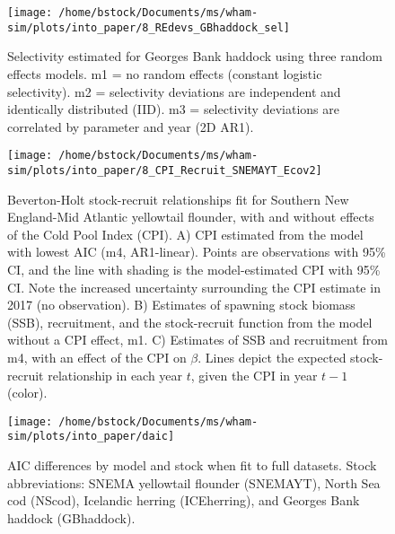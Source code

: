 \documentclass[]{article}
\begin{document}
\pagebreak

\begin{figure}

{\centering \texttt{[image: /home/bstock/Documents/ms/wham-sim/plots/into\_paper/8\_REdevs\_GBhaddock\_sel]} 

}

\caption{Selectivity estimated for Georges Bank haddock using three random effects models. m1 = no random effects (constant logistic selectivity). m2 = selectivity deviations are independent and identically distributed (IID). m3 = selectivity deviations are correlated by parameter and year (2D AR1).}\label{fig:devs-GBhaddock-sel}
\end{figure}

\pagebreak

\begin{figure}

{\centering \texttt{[image: /home/bstock/Documents/ms/wham-sim/plots/into\_paper/8\_CPI\_Recruit\_SNEMAYT\_Ecov2]} 

}

\caption{Beverton-Holt stock-recruit relationships fit for Southern New England-Mid Atlantic yellowtail flounder, with and without effects of the Cold Pool Index (CPI). A) CPI estimated from the model with lowest AIC (m4, AR1-linear). Points are observations with 95\% CI, and the line with shading is the model-estimated CPI with 95\% CI. Note the increased uncertainty surrounding the CPI estimate in 2017 (no observation). B) Estimates of spawning stock biomass (SSB), recruitment, and the stock-recruit function from the model without a CPI effect, m1. C) Estimates of SSB and recruitment from m4, with an effect of the CPI on $\beta$. Lines depict the expected stock-recruit relationship in each year $t$, given the CPI in year $t-1$ (color).}\label{fig:devs-SNEMAYT-ecov}
\end{figure}

\pagebreak

\begin{landscape}
\begin{figure}

{\centering \texttt{[image: /home/bstock/Documents/ms/wham-sim/plots/into\_paper/daic]} 

}

\caption{AIC differences by model and stock when fit to full datasets. Stock abbreviations: SNEMA yellowtail flounder (SNEMAYT), North Sea cod (NScod), Icelandic herring (ICEherring), and Georges Bank haddock (GBhaddock).}\label{fig:daic}
\end{figure}
\end{landscape}
\end{document}
